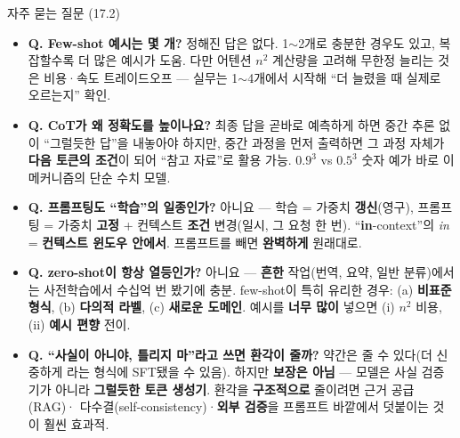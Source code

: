 \begin{frame}{자주 묻는 질문 (17.2)}
  \begin{itemize}
    \item \textbf{Q. Few-shot 예시는 몇 개?} 정해진 답은
      없다. 1$\sim$2개로 충분한 경우도 있고, 복잡할수록
      더 많은 예시가 도움. 다만 어텐션 $n^2$ 계산량을
      고려해 무한정 늘리는 것은 비용·속도 트레이드오프 —
      실무는 1$\sim$4개에서 시작해 ``더 늘렸을 때 실제로
      오르는지'' 확인.
    \item \textbf{Q. CoT가 왜 정확도를 높이나요?} 최종
      답을 곧바로 예측하게 하면 중간 추론 없이 ``그럴듯한
      답''을 내놓아야 하지만, 중간 과정을 먼저 출력하면 그
      과정 자체가 \textbf{다음 토큰의 조건}이 되어
      ``참고 자료''로 활용 가능. $0.9^3$ vs $0.5^3$ 숫자
      예가 바로 이 메커니즘의 단순 수치 모델.
    \item \textbf{Q. 프롬프팅도 ``학습''의 일종인가?}
      아니요 --- 학습 = 가중치 \textbf{갱신}(영구),
      프롬프팅 = 가중치 \textbf{고정} + 컨텍스트
      \textbf{조건} 변경(일시, 그 요청 한 번).
      ``\textbf{in}-context''의 \textit{in} =
      \textbf{컨텍스트 윈도우 안에서}. 프롬프트를 빼면
      \textbf{완벽하게} 원래대로.
    \item \textbf{Q. zero-shot이 항상 열등인가?} 아니요 ---
      \textbf{흔한} 작업(번역, 요약, 일반 분류)에서는
      사전학습에서 수십억 번 봤기에 충분. few-shot이 특히
      유리한 경우: (a) \textbf{비표준 형식}, (b)
      \textbf{다의적 라벨}, (c) \textbf{새로운 도메인}.
      예시를 \textbf{너무 많이} 넣으면 (i) $n^2$ 비용,
      (ii) \textbf{예시 편향} 전이. 
    \item \textbf{Q. ``사실이 아니야, 틀리지 마''라고 쓰면
      환각이 줄까?} 약간은 줄 수 있다(더 신중하게 라는
      형식에 SFT됐을 수 있음). 하지만 \textbf{보장은
      아님} --- 모델은 사실 검증기가 아니라
      \textbf{그럴듯한 토큰 생성기}. 환각을
      \textbf{구조적으로} 줄이려면 근거 공급(RAG)·
      다수결(self-consistency)·\textbf{외부 검증}을
      프롬프트 바깥에서 덧붙이는 것이 훨씬 효과적.
  \end{itemize}
\end{frame}
